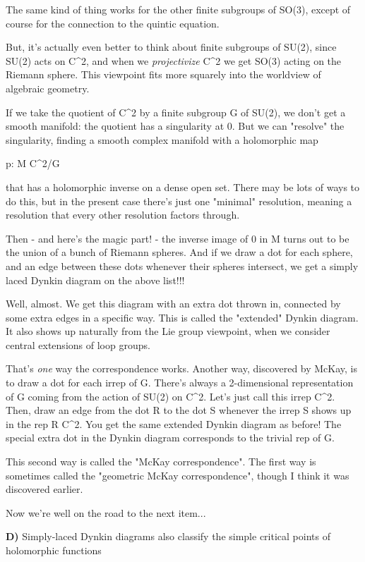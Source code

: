 The same kind of thing works for the other finite subgroups of SO(3),
except of course for the connection to the quintic equation.

But, it's actually even better to think about finite subgroups of 
SU(2), since SU(2) acts on C^{2}, and when we \emph{projectivize} C^{2} we
get SO(3) acting on the Riemann sphere.  This viewpoint fits more 
squarely into the worldview of algebraic geometry.

If we take the quotient of C^{2} by a finite subgroup G of SU(2), we 
don't get a smooth manifold: the quotient has a singularity at 0.
But we can "resolve" the singularity, finding a smooth complex manifold
with a holomorphic map

p: M \to  C^{2}/G

that has a holomorphic inverse on a dense open set.  There may be 
lots of ways to do this, but in the present case there's just one 
"minimal" resolution, meaning a resolution that every other resolution
factors through.

Then - and here's the magic part! - the inverse image of 0 in M 
turns out to be the union of a bunch of Riemann spheres.  And
if we draw a dot for each sphere, and an edge between these dots 
whenever their spheres intersect, we get a simply laced Dynkin 
diagram on the above list!!!

Well, almost.  We get this diagram with an extra dot thrown in,
connected by some extra edges in a specific way.  This is called 
the "extended" Dynkin diagram.  It also shows up naturally from 
the Lie group viewpoint, when we consider central extensions of 
loop groups.  

That's \emph{one} way the correspondence works.  Another way, discovered
by McKay, is to draw a dot for each irrep of G.  There's always a
2-dimensional representation of G coming from the action of SU(2) 
on C^{2}.  Let's just call this irrep C^{2}.  
Then, draw an edge
from the dot R to the dot S whenever the irrep S shows up 
in the rep R \otimes  C^{2}.
You get the same extended Dynkin diagram as before!
The special extra dot in the Dynkin diagram corresponds to the 
trivial rep of G.

This second way is called the "McKay correspondence".  The first way
is sometimes called the "geometric McKay correspondence", though I think
it was discovered earlier.

Now we're well on the road to the next item...

\textbf{D)} 
Simply-laced Dynkin diagrams also classify the simple critical points
of holomorphic functions 

